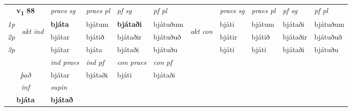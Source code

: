 \noindent
\begin{tabular}{lllllllllll} \toprule
\multicolumn{2}{c}{\textbf{v{\textsubscript{1}}} \Large{\textbf{88}}}  &  \textit{praes sg}  & \textit{praes pl}  &\textit{ pf sg} & \textit{pf pl} &  &  \textit{praes sg}  & \textit{praes pl}  & \textit{pf sg} & \textit{pf pl } \\*
	\cmidrule{3-6} \cmidrule{8-11}
 {\textit{1p}} & \multirow{3}{*}{\begin{turn}{90}\textit{akt ind}\end{turn}} & \textbf{bjáta} & bjátum & \textbf{bjátaði} & bjátuðum & \multirow{3}{*}{\begin{turn}{90}\textit{akt con}\end{turn}} &bjáti & bjátum & bjátaði & bjátuðum\\*
 {\textit{2p}} &  &  bjátar  & bjátið & bjátaðir & bjátuðuð & & bjátir & bjátið & bjátaðir & bjátuðuð \\*
{\textit{3p}} &  & bjátar & bjáta & bjátaði & bjátuðu & & bjáti & bjáti& bjátaði & bjátuðu \\*
\cmidrule{3-6} \cmidrule{8-11}

   & &  \textit{ind praes} & \textit{ind pf} & \textit{con praes} & \textit{con pf} \\*
\multicolumn{2}{c}{ \textit{það} } & bjátar & bjátaði & bjáti & bjátaði \\*

\cmidrule{3-3}
   \multicolumn{2}{c}{\textit{inf}}      & \textit{supin}   \\*
  \multicolumn{2}{c}{\textbf{bjáta}}       &  \textbf{bjátað}   \\*
\end{tabular}

